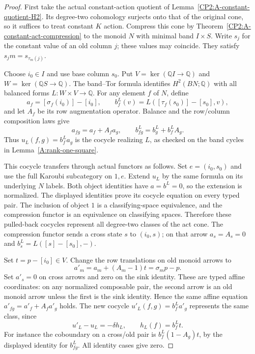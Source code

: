 \begin{proof}
First take the actual constant-action quotient of
Lemma~\ref{CP2:A-constant-quotient-H2}. Its degree-two
cohomology surjects onto that of the original cone, so it
suffices to treat constant $K$ action. Compress this cone
by Theorem~\ref{CP2:A-constant-act-compression} to the
monoid $N$ with minimal band $I\times S$. Write $s_j$
for the constant value of an old column $j$; these values
may coincide. They satisfy $s_jm=s_{\tau_m(j)}$.

Choose $i_0\in I$ and use base column $s_0$. Put
$V=\ker(\mathbb QI\to\mathbb Q)$ and
$W=\ker(\mathbb QS\to\mathbb Q)$. The band--Tor
formula identifies $H^2(BN;\mathbb Q)$ with all balanced
forms $L:W\times V\to\mathbb Q$. For any element $f$
of $N$, define
\[
 a_f=[\sigma_f(i_0)]-[i_0],\qquad
 b_f^L(v)=L([\tau_f(s_0)]-[s_0],v),
\]
and let $A_f$ be its row augmentation operator. Balance
and the row/column composition laws give
\[
 a_{fg}=a_f+A_fa_g,\qquad
 b_{fg}^L=b_g^L+b_f^LA_g.
\]
Thus $u_L(f,g)=b_f^La_g$ is the cocycle realizing $L$,
as checked on the band cycles in Lemma~\ref{A:rank-one-square}.

This cocycle transfers through actual functors as follows.
Set $e=(i_0,s_0)$ and use the full Karoubi subcategory
on $1,e$. Extend $u_L$ by the same formula on its
underlying $N$ labels. Both object identities have
$a=b^L=0$, so the extension is normalized. The displayed
identities prove its cocycle equation on every typed pair.
The inclusion of object $1$ is a classifying-space
equivalence, and the compression functor is an equivalence
on classifying spaces. Therefore these pulled-back
cocycles represent all degree-two classes of the act cone.
The compression functor sends a cross state $s$ to
$(i_0,s)$; on that arrow $a_s=A_s=0$ and
$b_s^L=L([s]-[s_0],-)$.

Set $t=p-[i_0]\in V$. Change the row translations on
old monoid arrows to
\[
 a'_m=a_m+(A_m-1)t=\sigma_mp-p.
\]
Set $a'_s=0$ on cross arrows and zero on the sink identity.
These are typed affine coordinates: on any normalized
composable pair, the second arrow is an old monoid arrow
unless the first is the sink identity. Hence the same
affine equation $a'_{fg}=a'_f+A_fa'_g$ holds.
The new cocycle $u'_L(f,g)=b_f^La'_g$ represents the
same class, since
\[
 u'_L-u_L=-\delta h_L,\qquad h_L(f)=b_f^Lt.
\]
For instance the coboundary on a cross/old pair is
$b_f^L(1-A_g)t$, by the displayed identity for $b_{fg}^L$.
All identity cases give zero.


\end{proof}

